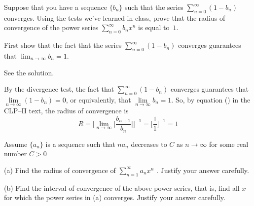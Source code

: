 \begin{Mquestion}[2015A]
 Suppose that you have a sequence $\{b_n\}$ such that the series $\sum_{n=0}^{\infty}(1-b_n)$ converges. Using the tests we've learned in class, prove that the radius of convergence of the power series $\displaystyle\sum_{n=0}^{\infty}b_nx^n$ is equal to~$1$.
\end{Mquestion}

\begin{hint}
First show that the fact that the series $\sum_{n=0}^{\infty}(1-b_n)$ converges
 guarantees that $\lim_{n\rightarrow\infty}b_n=1$.
\end{hint}

\begin{answer}
See the solution.
\end{answer}

\begin{solution}
By the divergence test, the fact that $\sum\limits_{n=0}^{\infty}(1-b_n)$
converges guarantees that $\lim\limits_{n\rightarrow\infty}(1-b_n)=0$,
or equivalently, that $\lim\limits_{n\rightarrow\infty}b_n=1$.  So, by
equation  ()  in the
CLP--II text, the radius of convergence is
\begin{equation}\label{eq:SRradConv}
R =\bigg[\lim_{n\rightarrow\infty}\Big|\frac{b_{n+1}}{b_n}\Big|\bigg]^{-1}
   =\bigg[\frac{1}{1}\bigg]^{-1}
  =1
\end{equation}


\end{solution}

\begin{question}[M121 2014A]
Assume $\big\{a_n \big\}$ is a sequence such that $na_n$ decreases to $C$ as
$n \rightarrow\infty$ for some real number $C > 0$


\noindent (a) Find the radius of convergence of $\displaystyle\sum\limits_{n=1}^\infty
 a_n x^n$ . Justify your answer carefully.

\noindent (b)  Find the interval of convergence of the above power series, that is,
find all $x$ for which the power series in (a) converges. Justify your answer carefully.
\end{question}

